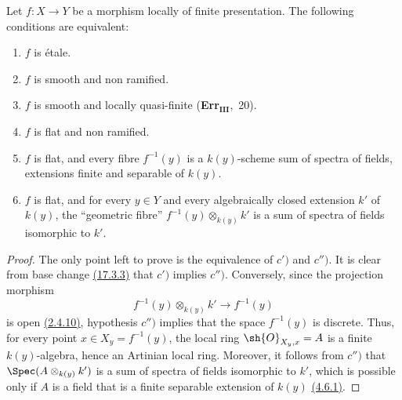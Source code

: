 \begin{corollary}[17.6.2]
\label{IV.17.6.2}
Let $f:X\to Y$ be a morphism locally of finite presentation.
The following conditions are equivalent:
\begin{enumerate}[label=(\alph*)]
  \item[a)] $f$ is \'etale.
  \item[a')] $f$ is smooth and non ramified.
  \item[b)] $f$ is smooth and locally quasi-finite (\textbf{Err}$_\textbf{III}$,~20).
  \item[c)] $f$ is flat and non ramified.
  \item[c')] $f$ is flat, and every fibre $f^{-1}(y)$ is a $k(y)$-scheme sum of spectra of fields, extensions finite and separable of $k(y)$.
  \item[c'')] $f$ is flat, and for every $y\in Y$ and every algebraically closed extension $k'$ of $k(y)$, the ``geometric fibre'' $f^{-1}(y)\otimes_{k(y)}k'$ is a sum of spectra of fields isomorphic to $k'$.
\end{enumerate}
\end{corollary}

\begin{proof}
The only point left to prove is the equivalence of $c')$ and $c'')$.
It is clear from base change {\hyperlink{ega4.c04.prop.17-3-3}{(17.3.3)}} that $c')$ implies $c'')$.
Conversely, since the projection morphism
\[
f^{-1}(y)\otimes_{k(y)}k'\longrightarrow f^{-1}(y)
\]
is open {\hyperlink{ega4.c04.cor.2-4-10}{(2.4.10)}}, hypothesis $c'')$ implies that the space $f^{-1}(y)$ is discrete.
Thus, for every point $x\in X_y=f^{-1}(y)$, the local ring $\sh{O}_{X_y,x}=A$ is a finite $k(y)$-algebra, hence an Artinian local ring.
Moreover, it follows from $c'')$ that $\Spec(A\otimes_{k(y)}k')$ is a sum of spectra of fields isomorphic to $k'$, which is possible only if $A$ is a field that is a finite separable extension of $k(y)$ {\hyperlink{ega4.c04.prop.4-6-1}{(4.6.1)}}.
\end{proof}

